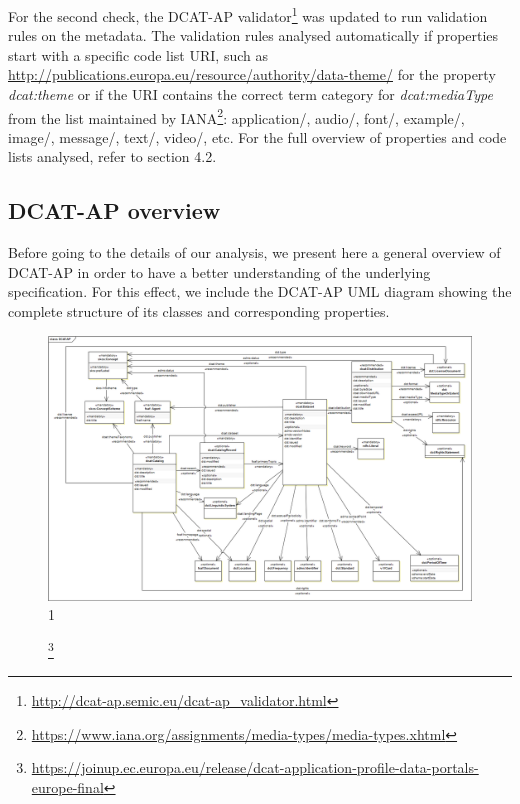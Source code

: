 \documentclass[<options>]{elsarticle}
\begin{document}
For the second check, the DCAT-AP validator\footnote{\href{ http://dcat-ap.semic.eu/dcat-ap_validator.html}{ http://dcat-ap.semic.eu/dcat-ap\_validator.html}} was updated to run validation rules on the metadata. The validation rules analysed automatically if properties start with a specific code list URI, such as \url{http://publications.europa.eu/resource/authority/data-theme/} for the property \textit{dcat:theme} or if the URI contains the correct term category for \textit{dcat:mediaType} from the list maintained by IANA\footnote{\href{  https://www.iana.org/assignments/media-types/media-types.xhtml}{https://www.iana.org/assignments/media-types/media-types.xhtml}}: application/, audio/, font/, example/, image/, message/, text/, video/, etc.  For the full overview of properties and code lists analysed, refer to section 4.2. 
% 
% 
% 

\subsection{DCAT-AP overview}

Before going to the details of our analysis, we present here a general overview of DCAT-AP in order to have a better understanding of the underlying specification. For this effect, we include the DCAT-AP UML diagram showing the complete structure of its classes and corresponding properties.

\begin{figure}[H]
\includegraphics[width=1\textwidth]{DCAT-AP_Final_v1_00.png}
1\caption[Caption for LOC]{\footnote{\href{DCAT-AP UML Class Diagram}{https://joinup.ec.europa.eu/release/dcat-application-profile-data-portals-europe-final}}}
\end{figure}
\end{document}
